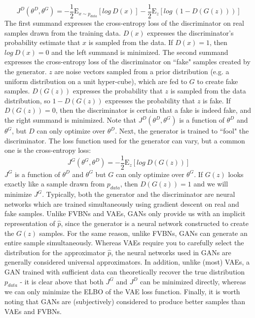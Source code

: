 \documentclass[a4paper]{article}
\begin{document}
\begin{enumerate}
{$$ J^D(\theta^D, \theta^G) = -\frac{1}{2} \mathrm{E}_{x \sim p_{data}} [log\ D(x)] - \frac{1}{2} \mathrm{E}_z [log\ (1 - D(G(z)))]$$
The first summand expresses the cross-entropy loss of the discriminator on real samples drawn from the training data. $D(x)$ expresses the discriminator's probability estimate that $x$ is sampled from the data. If $D(x) = 1$, then $log\ D(x) = 0$ and the left summand is minimized. The second summand expresses the cross-entropy loss of the discriminator on ``fake" samples created by the generator. $z$ are noise vectors sampled from a prior distribution (e.g. a uniform distribution on a unit hyper-cube), which are fed to $G$ to create fake samples. $D(G(z))$ expresses the probability that $z$ is sampled from the data distribution, so $1- D(G(z))$ expresses the probability that $z$ is fake. If $D(G(z)) = 0$, then the discriminator is certain that a fake is indeed fake, and the right summand is minimized. Note that $ J^D(\theta^D, \theta^G)$ is a function of $\theta^D$ and $\theta^G$, but $D$ can only optimize over $\theta^D$.
\newline
\newline
Next, the generator is trained to ``fool" the discriminator. The loss function used for the generator can vary, but a common one is the cross-entropy loss:
$$J^G(\theta^G, \theta^D) = -\frac{1}{2} \mathrm{E}_z [log \ D(G(z))] $$
$J^G$ is a function of $\theta^D$ and $\theta^G$ but $G$ can only optimize over $\theta^G$. If $G(z)$ looks exactly like a sample drawn from $p_{data}$, then $D(G(z)) = 1$ and we will minimize $J^G$.
\newline
\newline
Typically, both the generator and the discriminator are neural networks which are trained simultaneously using gradient descent on real and fake samples. Unlike FVBNs and VAEs, GANs only provide us with an implicit representation of $\hat{p}$, since the generator is a neural network constructed to create the $G(z)$ samples. For the same reason, unlike FVBNs, GANs can generate an entire sample simultaneously. Whereas VAEs require you to carefully select the distribution for the approximator $\hat{p}$, the neural networks used in GANs are generally considered universal approximators. In addition, unlike (most) VAEs, a GAN trained with sufficient data can theoretically recover the true distribution $p_{data}$ - it is clear above that both $J^G$ and $J^D$ can be minimized directly, whereas we can only minimize the ELBO of the VAE loss function. Finally, it is worth noting that GANs are (subjectively) considered to produce better samples than VAEs and FVBNs.
}
\end{enumerate}
\end{document}
